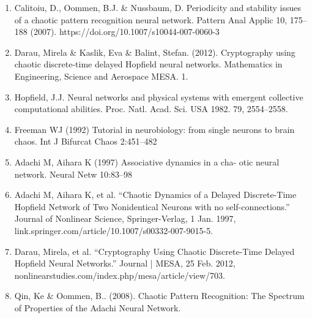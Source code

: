 \documentclass[12pt, letterpaper]{article}
\begin{document}
\begin{enumerate}[leftmargin=*]
    \item Calitoiu, D., Oommen, B.J. \& Nussbaum, D. Periodicity and stability issues of a chaotic pattern recognition neural network. Pattern Anal Applic 10, 175–188 (2007). https://doi.org/10.1007/s10044-007-0060-3
    \item Darau, Mirela \& Kaslik, Eva \& Balint, Stefan. (2012). Cryptography using chaotic discrete-time delayed Hopfield neural networks. Mathematics in Engineering, Science and Aerospace MESA. 1.
    \item Hopfield, J.J. Neural networks and physical systems with emergent collective computational abilities.
    Proc. Natl. Acad. Sci. USA 1982. 79, 2554–2558.
    \item Freeman WJ (1992) Tutorial in neurobiology: from single neurons to brain chaos. Int J Bifurcat Chaos 2:451–482
    \item Adachi M, Aihara K (1997) Associative dynamics in a cha- otic neural network. Neural Netw 10:83–98
    \item Adachi M, Aihara K, et al. “Chaotic Dynamics of a Delayed Discrete-Time Hopfield Network of Two Nonidentical Neurons with no self-connections.” Journal of Nonlinear Science, Springer-Verlag, 1 Jan. 1997, link.springer.com/article/10.1007/s00332-007-9015-5.
    \item Darau, Mirela, et al. “Cryptography Using Chaotic Discrete-Time Delayed Hopfield Neural Networks.” Journal | MESA, 25 Feb. 2012, nonlinearstudies.com/index.php/mesa/article/view/703.
    \item Qin, Ke \& Oommen, B.. (2008). Chaotic Pattern Recognition: The Spectrum of Properties of the Adachi Neural Network.
\end{enumerate}
\end{document}
